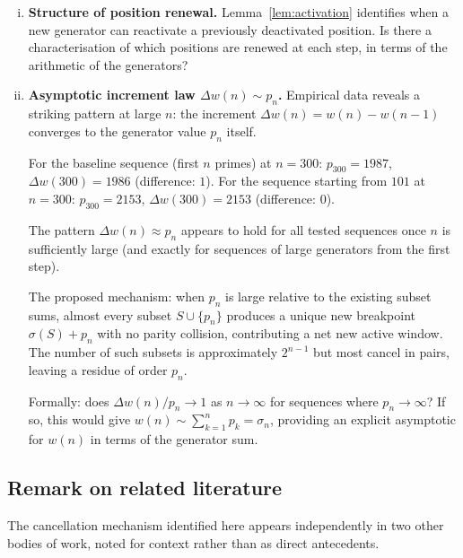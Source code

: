 \documentclass[11pt,a4paper]{amsart}
\theoremstyle{plain}
\theoremstyle{definition}
\theoremstyle{remark}
\begin{document}
\begin{enumerate}[(i)]
Odd-$n$ increments: $80, 82, 88, 104, 110, \ldots$ (increasing).
Even-$n$ increments: $72, 74, 84, 100, 106, \ldots$ (increasing).
Both sequences grow approximately linearly, offset by $\approx 8$.
This structure does not appear for $n < 19$ and coincides with
the onset of redundancy saturation.
What is the arithmetic mechanism behind this bipartite split?

\item \textbf{Structure of position renewal.}
Lemma~\ref{lem:activation} identifies when a new generator can
reactivate a previously deactivated position.
Is there a characterisation of which positions are renewed at each
step, in terms of the arithmetic of the generators?

\item \textbf{Asymptotic increment law $\Delta w(n) \sim p_n$.}
Empirical data reveals a striking pattern at large $n$:
the increment $\Delta w(n) = w(n) - w(n-1)$ converges to the
generator value $p_n$ itself.

For the baseline sequence (first $n$ primes) at $n=300$:
$p_{300} = 1987$, $\Delta w(300) = 1986$ (difference: $1$).
For the sequence starting from $101$ at $n=300$:
$p_{300} = 2153$, $\Delta w(300) = 2153$ (difference: $0$).

The pattern $\Delta w(n) \approx p_n$ appears to hold for all tested
sequences once $n$ is sufficiently large (and exactly for sequences
of large generators from the first step).

The proposed mechanism: when $p_n$ is large relative to the existing
subset sums, almost every subset $S \cup \{p_n\}$ produces a unique
new breakpoint $\sigma(S) + p_n$ with no parity collision, contributing
a net new active window. The number of such subsets is approximately
$2^{n-1}$ but most cancel in pairs, leaving a residue of order $p_n$.

Formally: does $\Delta w(n) / p_n \to 1$ as $n \to \infty$
for sequences where $p_n \to \infty$?
If so, this would give $w(n) \sim \sum_{k=1}^n p_k = \sigma_n$,
providing an explicit asymptotic for $w(n)$ in terms of the
generator sum.

\end{enumerate}

\subsection*{Remark on related literature}

The cancellation mechanism identified here appears independently in two
other bodies of work, noted for context rather than as direct antecedents.
\end{document}
